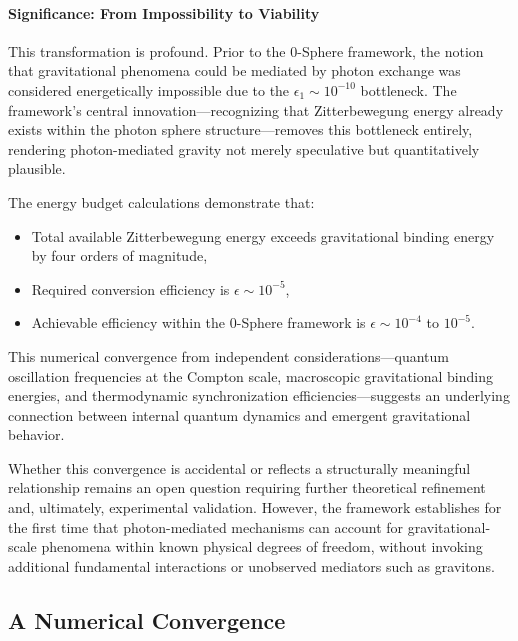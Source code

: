 \documentclass[12pt,letterpaper]{article}
\begin{document}
\paragraph{Significance: From Impossibility to Viability}

This transformation is profound. Prior to the 0-Sphere framework, the notion that gravitational phenomena could be mediated by photon exchange was considered energetically impossible due to the $\epsilon_1 \sim 10^{-10}$ bottleneck. The framework's central innovation—recognizing that Zitterbewegung energy already exists within the photon sphere structure—removes this bottleneck entirely, rendering photon-mediated gravity not merely speculative but quantitatively plausible.

The energy budget calculations demonstrate that:
\begin{itemize}
\item Total available Zitterbewegung energy exceeds gravitational binding energy by four orders of magnitude,
\item Required conversion efficiency is $\epsilon \sim 10^{-5}$,
\item Achievable efficiency within the 0-Sphere framework is $\epsilon \sim 10^{-4}$ to $10^{-5}$.
\end{itemize}

This numerical convergence from independent considerations—quantum oscillation frequencies at the Compton scale, macroscopic gravitational binding energies, and thermodynamic synchronization efficiencies—suggests an underlying connection between internal quantum dynamics and emergent gravitational behavior.

Whether this convergence is accidental or reflects a structurally meaningful relationship remains an open question requiring further theoretical refinement and, ultimately, experimental validation. However, the framework establishes for the first time that photon-mediated mechanisms can account for gravitational-scale phenomena within known physical degrees of freedom, without invoking additional fundamental interactions or unobserved mediators such as gravitons.


\subsection{A Numerical Convergence}
\label{subsec:numerical_convergence}
\end{document}
